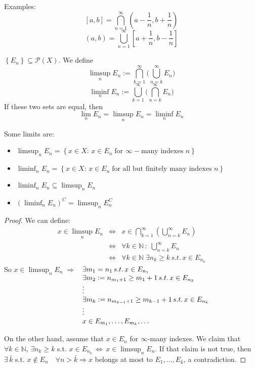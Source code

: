 Examples:
\[
    [a,b] = \bigcap_{n = 1}^{\infty} (a - \frac{1}{n}, b + \frac{1}{n}) 
\]
\[
    (a,b) = \bigcup_{n = 1}^{\infty}[a + \frac{1}{n}, b - \frac{1}{n}]
\]
\begin{definition}
    \(\left\lbrace E_n \right\rbrace \subseteq \mathcal{P}(X)\). We define 
    \[
        \limsup_{n} E_n := \bigcap_{k = 1}^{\infty} \bigl(\bigcup_{n = k}^{\infty} E_n\bigr)
    \]
    \[
        \liminf_{n} E_n := \bigcup_{k = 1}^{\infty} \bigl(\bigcap_{n = k}^{\infty} E_n\bigr)
    \]
    If these two sets are equal, then 
    \[
        \lim_n E_n = \limsup_n E_n = \liminf_n E_n
    \]
\end{definition}
\begin{proposition}
    Some limits are:
    \begin{itemize}
        \item \(\limsup_n E_n = \left\lbrace x \in X :\, x \in E_n \; \mbox{for }\infty-\mbox{many indexes }n \right\rbrace\)
        \item \(\liminf_n E_n = \left\lbrace x \in X :\, x \in E_n \; \mbox{for all but finitely many indexes }n \right\rbrace\)
        \item \(\liminf_n E_n \subseteq \limsup_n E_n\)
        \item \(\left( \liminf_n E_n\right)^C = \limsup_n E_n^C\) 
    \end{itemize}
\end{proposition}
\begin{proof}
    We can define:
    \[
    \begin{array}{ccc}
        x \in \limsup_n E_n & \Leftrightarrow & x \in \bigcap_{k = 1}^{\infty} \left(\bigcup_{n = k}^{\infty} E_n\right) \\
        & \Leftrightarrow & \forall k \in \mathbb{N} \, : \; \bigcup_{n = k}^{\infty} E_n \\
        & \Leftrightarrow &  \forall k \in \mathbb{N} \; \exists n_k \geq k \, s.t. \, x \in E_{n_k}
        
    \end{array}
\]
So \(x \in \limsup_n E_n \; \Rightarrow\) \(\begin{array}[t]{l}
    \exists m_1 = n_1 \, s.t. \, x \in E_{n_1} \\
    \exists m_2 := n_{m_1 + 1} \geq m_1 + 1 \, s.t. \, x \in E_{n_2} \\
    \vdots \\
    \exists m_k := n_{m_{k-1} + 1} \geq m_{k-1} + 1 \, s.t. \, x \in E_{n_k} \\
    \vdots \\
    x \in E_{m_1}, \ldots, E_{m_k}, \ldots 
\end{array}
\)

On the other hand, assume that \(x \in E_n\) for \(\infty\)-many indexes.
We claim that \(\forall k \in \mathbb{N} \), \( \exists n_k \geq k \) s.t. \( x \in E_{n_k} \, \Leftrightarrow \, x \in \limsup_n E_n\). 
If that claim is not true, then \(\exists \, \bar{k} \) s.t. \( x \not \in E_n \quad \forall n > \bar{k} \Rightarrow x\) belongs at most to \(E_1, \ldots, E_{\bar{k}}\), a contradiction. 
\end{proof}
